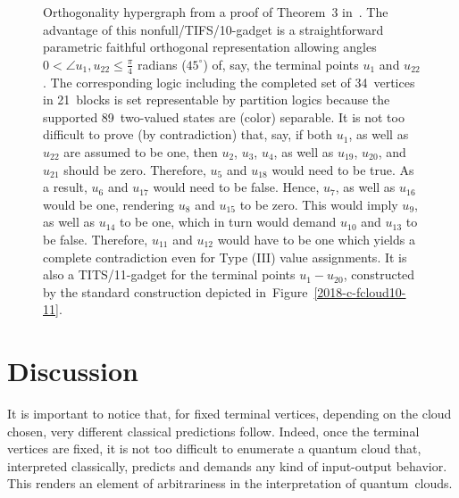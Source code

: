 \begin{figure}[H]
\begin{center}
\begin{tikzpicture} [scale=0.5,rotate=0]
\end{tikzpicture}
\end{center}
\caption{\label{2019-c-HH10}
Orthogonality hypergraph from a proof of
Theorem~3 in~\cite{Ramanathan-18}.
The advantage of this nonfull/TIFS/10-gadget
is a straightforward parametric faithful orthogonal representation allowing angles
$0< \angle u_1,u_{22} \le \frac{\pi}{4}$ radians ($45^\circ$)
of, say, the terminal points $u_1$ and $u_{22}$.
The corresponding logic including the completed set of
34~vertices in
21~blocks is set representable by partition logics because the supported 89~two-valued
states are (color) separable.
It is not too difficult to prove (by contradiction) that, say,
if both $u_1$, as well as $u_{22}$
are assumed to be one, then
$u_2$,
$u_3$,
$u_4$,
as well as
$u_{19}$,
$u_{20}$,
and $u_{21}$
should be zero.
Therefore,
$u_5$ and
$u_{18}$
would need to be true.
As a result,
$u_{6}$ and
$u_{17}$ would need to be false.
Hence,
$u_{7}$, as well as
$u_{16}$ would be one,
rendering
$u_{8}$ and
$u_{15}$ to be zero.
This would imply
$u_{9}$, as well as
$u_{14}$ to be one,
which in turn would demand
$u_{10}$ and
$u_{13}$ to be false.
Therefore,
$u_{11}$ and
$u_{12}$ would have to be one which yields a complete contradiction even for Type (III)
value assignments.
It is also a TITS/11-gadget for the terminal points
$u_1-u_{20}$, constructed by the standard construction depicted in~Figure~\ref{2018-c-fcloud10-11}.
}
\end{figure}

\section{Discussion}

It is important to notice that, for {fixed terminal vertices}, depending on the {cloud chosen}, very different classical predictions follow.
Indeed, once the terminal vertices are fixed, it is not too difficult to enumerate a quantum cloud that,
interpreted classically, predicts and demands {any} kind of input-output behavior.
This renders an element of arbitrariness in the interpretation of quantum~clouds.

